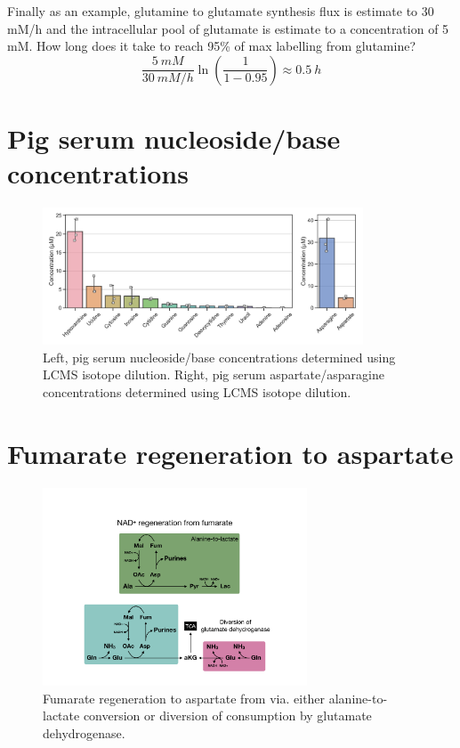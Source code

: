 Finally as an example, glutamine to glutamate synthesis flux is estimate to 30 mM/h and the intracellular pool of glutamate is estimate to a concentration of 5 mM.
How long does it take to reach 95\% of max labelling from glutamine?
\begin{equation}
     \frac{5\ mM}{30\ mM/h} \ln\left( \frac{1}{1 - 0.95} \right) \approx 0.5\ h
\label{eq:app_ch1:B_glu}
\end{equation}





\newpage
\section{Pig serum nucleoside/base concentrations}
\label{chap1_app:serum}
\begin{figure}[ht]
    \centering
    \includegraphics[width=0.85\textwidth]{figures/chap1/app/pig_nucl_conc.pdf}
    \caption[Pig serum nucleoside/base concentrations.]{
    Left, pig serum nucleoside/base concentrations determined using LCMS isotope dilution.
    Right, pig serum aspartate/asparagine concentrations determined using LCMS isotope dilution.
    }
    \label{fig:app_ch1:pig_nucl_conc}
\end{figure}

\newpage
\section{Fumarate regeneration to aspartate}
\label{chap1_app:fumarate_NAD}
\begin{figure}[ht]
    \centering
    \includegraphics[width=0.7\textwidth]{figures/chap1/app/fumarate_NAD.pdf}
    \caption[Fumarate regeneration to aspartate.]{
    Fumarate regeneration to aspartate from via. either alanine-to-lactate conversion or diversion of \NAD{} consumption by glutamate dehydrogenase.
    }
    \label{fig:app_ch1:fumarate_NAD}
\end{figure}
